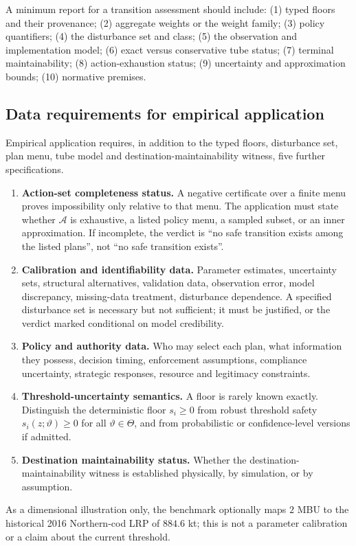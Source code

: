 \documentclass[preprint,11pt,authoryear]{elsarticle}
\theoremstyle{remark}
\begin{document}
A minimum report for a transition assessment should include: (1) typed floors and their provenance; (2) aggregate weights or the weight family; (3) policy quantifiers; (4) the disturbance set and class; (5) the observation and implementation model; (6) exact versus conservative tube status; (7) terminal maintainability; (8) action-exhaustion status; (9) uncertainty and approximation bounds; (10) normative premises.

\subsection{Data requirements for empirical application}

Empirical application requires, in addition to the typed floors, disturbance set, plan menu, tube model and destination-maintainability witness, five further specifications.
\begin{enumerate}[leftmargin=2em]
\item \textbf{Action-set completeness status.} A negative certificate over a finite menu proves impossibility only relative to that menu. The application must state whether $\mathcal A$ is exhaustive, a listed policy menu, a sampled subset, or an inner approximation. If incomplete, the verdict is ``no safe transition exists among the listed plans'', not ``no safe transition exists''.
\item \textbf{Calibration and identifiability data.} Parameter estimates, uncertainty sets, structural alternatives, validation data, observation error, model discrepancy, missing-data treatment, disturbance dependence. A specified disturbance set is necessary but not sufficient; it must be justified, or the verdict marked conditional on model credibility.
\item \textbf{Policy and authority data.} Who may select each plan, what information they possess, decision timing, enforcement assumptions, compliance uncertainty, strategic responses, resource and legitimacy constraints.
\item \textbf{Threshold-uncertainty semantics.} A floor is rarely known exactly. Distinguish the deterministic floor $s_i\ge0$ from robust threshold safety $s_i(z;\vartheta)\ge0$ for all $\vartheta\in\Theta$, and from probabilistic or confidence-level versions if admitted.
\item \textbf{Destination maintainability status.} Whether the destination-maintainability witness is established physically, by simulation, or by assumption.
\end{enumerate}
As a dimensional illustration only, the benchmark optionally maps $2$ MBU to the historical 2016 Northern-cod LRP of $884.6$ kt; this is not a parameter calibration or a claim about the current threshold.
\end{document}
